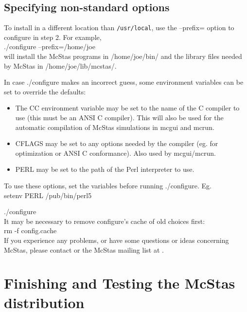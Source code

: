 \subsection{Specifying non-standard options}
To install in a different location than \texttt{/usr/local}, use the --prefix= option to
configure in step 2. For example,\\

  ./configure --prefix=/home/joe\\

\noindent will install the McStas programs in /home/joe/bin/ and the
library files needed by McStas in /home/joe/lib/mcstas/.

In case ./configure makes an incorrect guess, some environment variables
can be set to override the defaults:
\begin{itemize}
\item{The CC environment variable may be set to the name of the C compiler
   to use (this must be an ANSI C compiler). This will also be used for
   the automatic compilation of McStas simulations in mcgui and
   mcrun.}
\item{CFLAGS may be set to any options needed by the compiler (eg. for
   optimization or ANSI C conformance). Also used by mcgui/mcrun.}
\item{PERL may be set to the path of the Perl interpreter to use.}
\end{itemize}
\noindent To use these options, set the variables before running ./configure. Eg.\\

    setenv PERL /pub/bin/perl5

    ./configure\\

\noindent It may be necessary to remove configure's cache of old
choices first:\\


    rm -f config.cache\\


\noindent If you experience any problems, or have some questions or ideas
concerning McStas, please contact
or the McStas mailing list at .

\section{Finishing and Testing the McStas distribution}
\label{s:testing}

